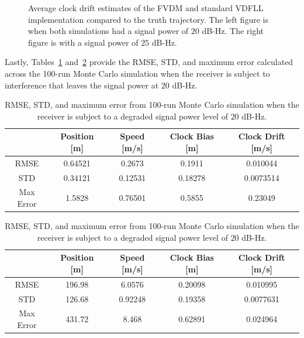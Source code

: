 \begin{figure}[!ht]
\begin{subfigure}{.45\textwidth}
    \end{subfigure}
    \caption{Average clock drift estimates of the FVDM and standard VDFLL implementation compared to the truth trajectory. The left figure is when both simulations had a signal power of \(20\) dB-Hz. The right figure is with a signal power of \(25\) dB-Hz.}\label{fig:Clocks4}
\end{figure}

Lastly, Tables~\ref{tbl:dyn20FVDM} and~\ref{tbl:dyn20CV} provide the RMSE, STD, and maximum error calculated across the 100-run Monte Carlo simulation when the receiver is subject to interference that leaves the signal power at \(20\) dB-Hz.
\begin{table}[!ht]
    \caption{RMSE, STD, and maximum error from 100-run Monte Carlo simulation when the receiver is subject to a degraded signal power level of \(20\) dB-Hz.}\label{tbl:dyn20FVDM}
    \centering
    \begin{tabular}{ccccc}
        \toprule
                  & Position [m] & Speed [m/s] & Clock Bias [m] & Clock Drift [m/s] \\
        \midrule
        RMSE      & 0.64521      & 0.2673      & 0.1911         & 0.010044          \\
        STD       & 0.34121      & 0.12531     & 0.18278        & 0.0073514         \\
        Max Error & 1.5828       & 0.76501     & 0.5855         & 0.23049           \\
        \bottomrule
    \end{tabular}
\end{table}

\begin{table}[!ht]
    \caption{RMSE, STD, and maximum error from 100-run Monte Carlo simulation when the receiver is subject to a degraded signal power level of \(20\) dB-Hz.}\label{tbl:dyn20CV}
    \centering
    \begin{tabular}{ccccc}
        \toprule
                  & Position [m] & Speed [m/s] & Clock Bias [m] & Clock Drift [m/s] \\
        \midrule
        RMSE      & 196.98       & 6.0576      & 0.20098        & 0.010995          \\
        STD       & 126.68       & 0.92248     & 0.19358        & 0.0077631         \\
        Max Error & 431.72       & 8.468       & 0.62891        & 0.024964          \\
        \bottomrule
    \end{tabular}
\end{table}

